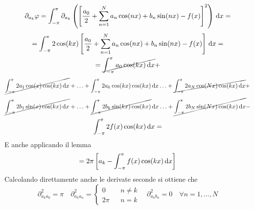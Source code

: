 \[\partial_{a_k}\varphi = \int_{-\pi}^{\pi}\partial_{a_k}\left(\left[\frac{a_0}{2}+\sum\limits_{n=1}^{N}a_{n}\cos(nx)+b_{n}\sin(nx)-f(x)\right]^2\right)\,\mathrm{d}{x}=\]
\[ = \int_{-\pi}^{\pi} 2\cos(kx) \left[\frac{a_0}{2}+\sum\limits_{n=1}^{N}a_{n}\cos(nx)+b_{n}\sin(nx)-f(x)\right]\,\mathrm{d}{x}=\]
\[ =  \cancel{\int_{-\pi}^{\pi} a_0\cos(kx)\,\mathrm{d}{x}} + \]
\[\cancel{\int_{-\pi}^{\pi} 2a_1\cos(x)\cos(kx)\,\mathrm{d}{x}} +
\ldots +
\int_{-\pi}^{\pi} 2a_k \cos(kx)\cos(kx)\,\mathrm{d}{x}
\ldots +
\cancel{\int_{-\pi}^{\pi} 2a_N \cos(Nx)\cos(kx)\,\mathrm{d}{x}} + \]
\[\cancel{\int_{-\pi}^{\pi} 2b_1\sin(x)\cos(kx)\,\mathrm{d}{x}} +
\ldots +
\cancel{\int_{-\pi}^{\pi} 2b_k \sin(kx)\cos(kx)}\,\mathrm{d}{x}
\ldots +
\cancel{\int_{-\pi}^{\pi} 2b_N \sin(Nx)\cos(kx)\,\mathrm{d}{x}} - \]
\[\int_{-\pi}^{\pi} 2f(x)\cos(kx)\,\mathrm{d}{x} = \]
E anche applicando il lemma
\[=2\pi\left[a_k-\int_{-\pi}^{\pi}f(x)\cos(kx)\,\mathrm{d}{x}\right]\]
Calcolando direttamente anche le derivate seconde si ottiene che
\[\partial^2_{a_ka_0}=\pi\quad\partial^2_{a_ka_n}=
\left\{\begin{matrix}
0&&n\ne k\\2\pi&&n=k
\end{matrix}\right.
\quad\partial^2_{a_kb_n}=0\quad\forall n=1,\dotsc,N\]

